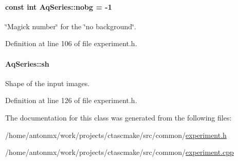 \hypertarget{classAqSeries_aa52b4d6b06f4f139eba2e89c74f2b0cb}{
\paragraph[{nobg}]{\setlength{\rightskip}{0pt plus 5cm}const int {\bf AqSeries::nobg} = -\/1}\hfill}
\label{classAqSeries_aa52b4d6b06f4f139eba2e89c74f2b0cb}


\char`\"{}Magick number\char`\"{} for the \char`\"{}no background\char`\"{}. 



Definition at line 106 of file experiment.h.

\hypertarget{classAqSeries_ab812affe8426bfd1e4fb81549cb16f71}{
\paragraph[{sh}]{ {\bf AqSeries::sh}}\hfill}
\label{classAqSeries_ab812affe8426bfd1e4fb81549cb16f71}


Shape of the input images. 



Definition at line 126 of file experiment.h.



The documentation for this class was generated from the following files:\begin{DoxyCompactItemize}
\item 
/home/antonmx/work/projects/ctascmake/src/common/\hyperlink{experiment_8h}{experiment.h}\item 
/home/antonmx/work/projects/ctascmake/src/common/\hyperlink{experiment_8cpp}{experiment.cpp}\end{DoxyCompactItemize}
